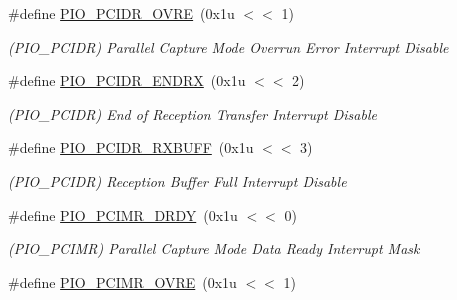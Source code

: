 \begin{DoxyCompactItemize}
\mbox{\label{group__SAMS70__PIO_gadd79e56caf9c1c59a364466206a4d032}} 
\#define \mbox{\hyperlink{group__SAMS70__PIO_gadd79e56caf9c1c59a364466206a4d032}{P\+I\+O\+\_\+\+P\+C\+I\+D\+R\+\_\+\+O\+V\+RE}}~(0x1u $<$$<$ 1)
\begin{DoxyCompactList}\small\item\em (P\+I\+O\+\_\+\+P\+C\+I\+DR) Parallel Capture Mode Overrun Error Interrupt Disable \end{DoxyCompactList}\item 
\mbox{\label{group__SAMS70__PIO_gad5d0348ece536d02949596cdd018675b}} 
\#define \mbox{\hyperlink{group__SAMS70__PIO_gad5d0348ece536d02949596cdd018675b}{P\+I\+O\+\_\+\+P\+C\+I\+D\+R\+\_\+\+E\+N\+D\+RX}}~(0x1u $<$$<$ 2)
\begin{DoxyCompactList}\small\item\em (P\+I\+O\+\_\+\+P\+C\+I\+DR) End of Reception Transfer Interrupt Disable \end{DoxyCompactList}\item 
\mbox{\label{group__SAMS70__PIO_ga994060bd48c7cd20b85a4dd1a624eb4d}} 
\#define \mbox{\hyperlink{group__SAMS70__PIO_ga994060bd48c7cd20b85a4dd1a624eb4d}{P\+I\+O\+\_\+\+P\+C\+I\+D\+R\+\_\+\+R\+X\+B\+U\+FF}}~(0x1u $<$$<$ 3)
\begin{DoxyCompactList}\small\item\em (P\+I\+O\+\_\+\+P\+C\+I\+DR) Reception Buffer Full Interrupt Disable \end{DoxyCompactList}\item 
\mbox{\label{group__SAMS70__PIO_ga03ee08b548c54753bd2186d6f72f5582}} 
\#define \mbox{\hyperlink{group__SAMS70__PIO_ga03ee08b548c54753bd2186d6f72f5582}{P\+I\+O\+\_\+\+P\+C\+I\+M\+R\+\_\+\+D\+R\+DY}}~(0x1u $<$$<$ 0)
\begin{DoxyCompactList}\small\item\em (P\+I\+O\+\_\+\+P\+C\+I\+MR) Parallel Capture Mode Data Ready Interrupt Mask \end{DoxyCompactList}\item 
\mbox{\label{group__SAMS70__PIO_gaad07af8efbc91d85035d14d99941a9c5}} 
\#define \mbox{\hyperlink{group__SAMS70__PIO_gaad07af8efbc91d85035d14d99941a9c5}{P\+I\+O\+\_\+\+P\+C\+I\+M\+R\+\_\+\+O\+V\+RE}}~(0x1u $<$$<$ 1)
$$
\end{DoxyCompactItemize}
